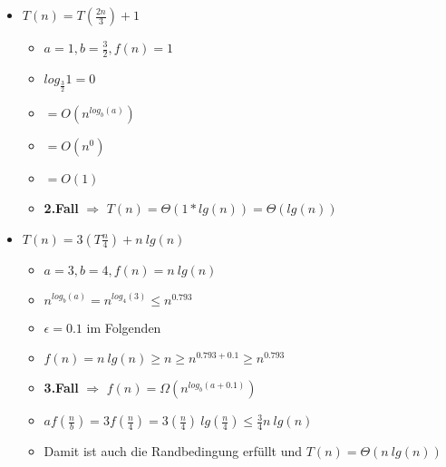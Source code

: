 \begin{itemize}
\begin{itemize}
\begin{itemize}
                        \item \textit{$T(n) = T(\frac{2n}{3}) + 1$}
                            \begin{itemize}
                                \item $a=1, b= \frac{3}{2}, f(n) = 1$
                                \item $log_{\frac{3}{2}} 1 = 0$
                                \item {} $= O(n^{log_b(a)})$
                                \item[] {\makebox[1.5cm][l]{}} $= O(n^0)$
                                \item[] {\makebox[1.5cm][l]{}} $= O(1)$
                                \item \textbf{2.Fall} $\Rightarrow$ $T(n) = \Theta(1 * lg(n)) = \Theta(lg(n))$   
                            \end{itemize}

                        \item \textit{$T(n) = 3(T\frac{n}{4}) + n~lg(n)$}
                            \begin{itemize}
                                \item $a=3,b=4,f(n)= n~lg(n)$
                                \item $n^{log_b(a)} = n^{log_4(3)} \leq n^{0.793}$
                                \item $\epsilon = 0.1$ im Folgenden
                                \item $f(n) = n~lg(n) \geq n \geq n^{0.793 + 0.1} \geq n^{0.793}$ 
                                \item \textbf{3.Fall} $\Rightarrow$ $f(n) = \Omega(n^{log_b(a+0.1)})$
                                \item $a f(\frac{n}{b}) = 3f(\frac{n}{4}) = 3(\frac{n}{4})~lg(\frac{n}{4}) \leq \frac{3}{4} n~lg(n)$
                                \item Damit ist auch die Randbedingung erfüllt und $T(n) = \Theta(n~lg(n))$
                                
                            \end{itemize}
                    \end{itemize}
            \end{itemize}

    \end{itemize}




